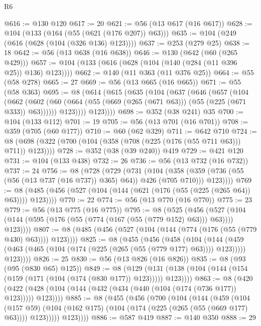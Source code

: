 \begin{lexlean}{R6}
\begin{coremodule}
@616 := @130 @120
@617 := 20
@621 := @56 (@13 @617 (@16 @617))
@628 := @104 (@133 (@164 (@55 (@621 (@176 @207)) @63)))
@635 := @104 (@249 (@616 (@628 (@104 (@326 @136) @123))))
@637 := @253 (@279 @25)
@638 := 18
@642 := @56 (@13 @638 (@16 @638))
@646 := @130 (@642 (@60 (@265 @429)))
@657 := @104 (@133 (@616 (@628 (@104 (@140 (@284 (@11 @396 @25)) @136) @123))))
@662 := @140 (@11 @363 (@11 @376 @25))
@664 := @55 (@58 @278)
@665 := 27
@669 := @56 (@13 @665 (@16 @665))
@671 := @55 (@58 @363)
@695 := @8
    (@614
      (@615
        (@635
          (@104
            (@637
              (@646
                (@657
                  (@104
                    (@662
                      (@602
                        (@60 (@664 (@55 (@669 (@265 (@671 @63))) (@55 (@225 (@671 @333)) @63))))))
                    @123))))
            @123))))
@698 := @352 (@38 @241) @35
@700 := @104 (@133 @112)
@701 := 19
@705 := @56 (@13 @701 (@16 @701))
@708 := @359 (@705 (@60 @177))
@710 := @60 (@62 @329)
@711 := @642 @710
@724 := @8 (@698 (@322 (@700 (@104 (@358 (@708 (@225 (@176 (@55 @711 @63))) @711)) @123))))
@728 := @352 (@38 (@39 @240)) @419
@729 := @421 @120
@731 := @104 (@133 @438)
@732 := 26
@736 := @56 (@13 @732 (@16 @732))
@737 := 24
@756 := @8
    (@728
      (@729
        (@731
          (@104
            (@358 (@359 (@736 (@55 (@56 (@13 @737 (@16 @737)) @365) @64)) @426 (@705 @710)))
            @123))))
@769 := @8 (@485 (@456 (@527 (@104 (@144 (@621 (@176 (@55 (@225 (@265 @64)) @63)))) @123))))
@770 := 22
@774 := @56 (@13 @770 (@16 @770))
@775 := 23
@779 := @56 (@13 @775 (@16 @775))
@795 := @8
    (@525
      (@456 (@527 (@104 (@144 (@595 (@176 (@55 (@774 (@167 (@55 (@779 @152) @63))) @63)))) @123))))
@807 := @8 (@485 (@456 (@527 (@104 (@144 (@774 (@176 (@55 (@779 @430) @63)))) @123))))
@825 := @8
    (@455
      (@456
        (@458
          (@104
            (@144 (@459 (@463 (@465 (@104 (@174 (@225 (@265 (@55 (@779 @177) @63)))) @123)))))
            @123))))
@826 := 25
@830 := @56 (@13 @826 (@16 @826))
@835 := @8 (@93 (@95 (@830 @65) @125))
@849 := @8
    (@129 (@131 (@138 (@104 (@144 (@154 (@159 (@171 (@104 (@174 (@830 @177)) @123))))) @123))))
@863 := @8
    (@420 (@422 (@428 (@104 (@144 (@432 (@434 (@440 (@104 (@174 (@736 @177)) @123))))) @123))))
@885 := @8
    (@455
      (@456
        (@700
          (@104
            (@144
              (@459
                (@104
                  (@157 @59)
                  (@104 (@162 @175) (@104 (@174 (@225 (@265 (@55 (@669 @177) @63)))) @123)))))
            @123))))
@886 := @587 @419
@887 := @140 @350
@888 := 29

\end{coremodule}
\end{lexlean}
